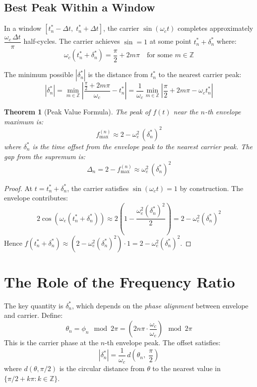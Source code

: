 \documentclass[12pt]{article}
\newtheorem{theorem}{Theorem}
\theoremstyle{definition}
\theoremstyle{remark}
\begin{document}
\subsection{Best Peak Within a Window}
In a window $[t_n^* - \Delta t,\; t_n^* + \Delta t]$, the carrier $\sin(\omega_c t)$ completes approximately $\dfrac{\omega_c\,\Delta t}{\pi}$ half-cycles. The carrier achieves $\sin = 1$ at some point $t_n^* + \delta_n^*$ where:
\[
\omega_c(t_n^* + \delta_n^*) = \frac{\pi}{2} + 2m\pi \quad\text{for some } m \in \mathbb{Z}
\]

The minimum possible $|\delta_n^*|$ is the distance from $t_n^*$ to the nearest carrier peak:
\[
|\delta_n^*| = \min_{m \in \mathbb{Z}} \left|\frac{\frac{\pi}{2} + 2m\pi}{\omega_c} - t_n^*\right|
= \frac{1}{\omega_c}\min_{m \in \mathbb{Z}} \left|\frac{\pi}{2} + 2m\pi - \omega_c t_n^*\right|
\]

\begin{theorem}[Peak Value Formula]
The peak of $f(t)$ near the $n$-th envelope maximum is:
\[
\boxed{f_{\max}^{(n)} \approx 2 - \omega_e^2\,(\delta_n^*)^2}
\]
where $\delta_n^*$ is the time offset from the envelope peak to the nearest carrier peak. The gap from the supremum is:
\[
\Delta_n = 2 - f_{\max}^{(n)} \approx \omega_e^2\,(\delta_n^*)^2
\]
\end{theorem}

\begin{proof}
At $t = t_n^* + \delta_n^*$, the carrier satisfies $\sin(\omega_c t) = 1$ by construction. The envelope contributes:
\[
2\cos(\omega_e(t_n^* + \delta_n^*)) \approx 2\left(1 - \frac{\omega_e^2(\delta_n^*)^2}{2}\right)
= 2 - \omega_e^2(\delta_n^*)^2
\]
Hence $f(t_n^* + \delta_n^*) \approx (2 - \omega_e^2(\delta_n^*)^2) \cdot 1 = 2 - \omega_e^2(\delta_n^*)^2$.
\end{proof}

\section{The Role of the Frequency Ratio}

The key quantity is $\delta_n^*$, which depends on the \emph{phase alignment} between envelope and carrier. Define:
\[
\theta_n = \phi_n \mod 2\pi = \left(2n\pi\cdot\frac{\omega_c}{\omega_e}\right) \mod 2\pi
\]
This is the carrier phase at the $n$-th envelope peak. The offset satisfies:
\[
|\delta_n^*| = \frac{1}{\omega_c}\,d\!\left(\theta_n,\;\frac{\pi}{2}\right)
\]
where $d(\theta, \pi/2)$ is the circular distance from $\theta$ to the nearest value in $\{\pi/2 + k\pi : k \in \mathbb{Z}\}$.
\end{document}
